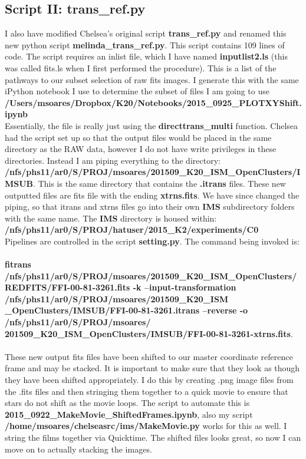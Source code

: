 \documentclass[11pt,letterpaper]{book} %
\begin{document}
\subsection*{Script II: \textbf{trans\_ref.py}}
I also have modified Chelsea's original script \textbf{trans\_ref.py} and renamed this new python script \textbf{melinda\_trans\_ref.py}. This script contains 109 lines of code. 
The script requires an inlist file, which I have named \textbf{inputlist2.ls} (this was called fits.ls when I first performed the procedure). This is a list of the pathways to our subset selection of raw fits images. I generate this with the same iPython notebook I use to determine the subset of files I am going to use \\ \textbf{/Users/msoares/Dropbox/K20/Notebooks/2015\_0925\_PLOTXYShift.ipynb}\\

Essentially, the file is really just using the \textbf{directtrans\_multi} function. 
Chelsea had the script set up so that the output files would be placed in the same directory as the RAW data, however I do not have write privileges in these directories. Instead I am piping everything to the directory: \textbf{/nfs/phs11/ar0/S/PROJ/msoares/201509\_K20\_ISM\_OpenClusters/IMSUB}. 
This is the same directory that contains the \textbf{.itrans} files. These new outputted files are fits file with the ending \textbf{xtrns.fits}. We have since changed the piping, so that itrans and xtrns files go into their own \textbf{IMS} subdirectory folders with the same name. The \textbf{IMS} directory is housed within: \textbf{/nfs/phs11/ar0/S/PROJ/hatuser/2015\_K2/experiments/C0}\\
Pipelines are controlled in the script \textbf{setting.py}.
The command being invoked is: \\ \\
\textbf{fitrans /nfs/phs11/ar0/S/PROJ/msoares/201509\_K20\_ISM\_OpenClusters/REDFITS/FFI-00-81-3261.fits -k --input-transformation /nfs/phs11/ar0/S/PROJ/msoares/201509\_K20\_ISM \\ \_OpenClusters/IMSUB/FFI-00-81-3261.itrans --reverse -o /nfs/phs11/ar0/S/PROJ/msoares/ \\
201509\_K20\_ISM\_OpenClusters/IMSUB/FFI-00-81-3261-xtrns.fits}.\\ \\ 
These new output fits files have been shifted to our master coordinate reference frame and may be stacked. It is important to make sure that they look as though they have been shifted appropriately. I do this by creating .png image files from the .fits files and then stringing them together to a quick movie to ensure that stars do not shift as the movie loops. The script to automate this is \textbf{2015\_0922\_MakeMovie\_ShiftedFrames.ipynb}, also my script 
\textbf{/home/msoares/chelseasrc/ims/MakeMovie.py} works for this as well. 
I string the films together via Quicktime. The shifted files looks great, so now I can move on to actually stacking the images.
\end{document}
